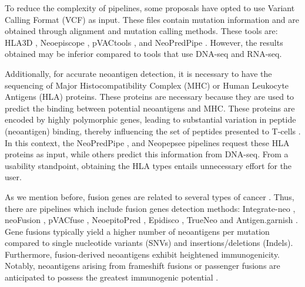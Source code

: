 To reduce the complexity of pipelines, some proposals have opted to use Variant Calling Format (VCF) as input. These files contain mutation information and are obtained through alignment and mutation calling methods. These tools are: HLA3D \cite{li2022hla3d}, Neoepiscope \cite{wood2020neoepiscope}, pVACtools \cite{hundal2020pvactools}, and NeoPredPipe \cite{schenck2019neopredpipe}. However, the results obtained may be inferior compared to tools that use DNA-seq and RNA-seq.

Additionally, for accurate neoantigen detection, it is necessary to have the sequencing of Major Histocompatibility Complex (MHC) or Human Leukocyte Antigens (HLA) proteins. These proteins are necessary because they are used to predict the binding between potential neoantigens and MHC. These proteins are encoded by highly polymorphic genes, leading to substantial variation in peptide (neoantigen) binding, thereby influencing the set of peptides presented to T-cells \cite{abualrous2021major}. In this context, the  NeoPredPipe \cite{schenck2019neopredpipe}, and Neopepsee \cite{kim2018neopepsee} pipelines request these HLA proteins as input, while others predict this information from DNA-seq. From a usability standpoint, obtaining the HLA types entails unnecessary effort for the user.

As we mention before, fusion genes are related to several types of cancer \cite{wood2020neoepiscope,wei2021re,yakushina2018gene,panicker2023exploring,lei2022eml4,zhang2022roles,panagopoulos2023novel}. Thus, there are pipelines which include fusion genes detection methods: Integrate-neo \cite{zhang2017integrate}, neoFusion \cite{wei2019landscape}, pVACfuse \cite{hundal2020pvactools}, NeoepitoPred \cite{chang2017neoepitope}, Epidisco \cite{rubinsteyn2018computational}, TrueNeo \cite{tang2020truneo} and Antigen.garnish \cite{rech2018tumor}. Gene fusions typically yield a higher number of neoantigens per mutation compared to single nucleotide variants (SNVs) and insertions/deletions (Indels). Furthermore, fusion-derived neoantigens exhibit heightened immunogenicity. Notably, neoantigens arising from frameshift fusions or passenger fusions are anticipated to possess the greatest immunogenic potential \cite{wang2021gene}. 



